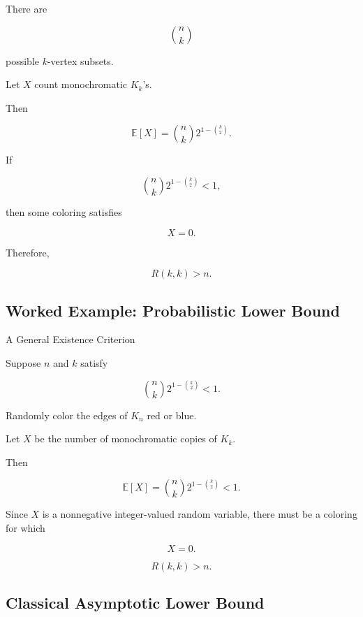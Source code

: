 There are

\[
\binom nk
\]

possible \(k\)-vertex subsets.

Let \(X\) count monochromatic \(K_k\)'s.

Then

\[
\boxed{
\mathbb{E}[X]
=
\binom nk
2^{1-\binom{k}{2}}.
}
\]

If

\[
\binom nk
2^{1-\binom{k}{2}}
<1,
\]

then some coloring satisfies

\[
X=0.
\]

Therefore,

\[
\boxed{
R(k,k)>n.
}
\]

\subsection{Worked Example: Probabilistic Lower Bound}
\label{subsec:worked-probabilistic-ramsey-bound}

\begin{workedexamplebox}{A General Existence Criterion}

Suppose \(n\) and \(k\) satisfy

\[
\binom nk
2^{1-\binom{k}{2}}
<1.
\]

Randomly color the edges of \(K_n\) red or blue.

Let \(X\) be the number of monochromatic copies of \(K_k\).

Then

\[
\mathbb{E}[X]
=
\binom nk
2^{1-\binom{k}{2}}
<1.
\]

Since \(X\) is a nonnegative integer-valued random variable, there must
be a coloring for which

\[
X=0.
\]

\begin{answerbox}
\[
\boxed{
R(k,k)>n.
}
\]
\end{answerbox}

\end{workedexamplebox}

\subsection{Classical Asymptotic Lower Bound}
\label{subsec:classical-ramsey-lower}

